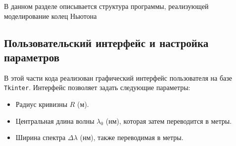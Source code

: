 \documentclass[a4paper,11pt]{article}
\theoremstyle{definition}
\begin{document}
    В данном разделе описывается структура программы, реализующей моделирование колец Ньютона

    \subsection{Пользовательский интерфейс и настройка параметров}
    В этой части кода реализован графический интерфейс пользователя на базе \texttt{Tkinter}.
    Интерфейс позволяет задать следующие параметры:
    \begin{itemize}
            \item Радиус кривизны \( R \) (м).
            \item Центральная длина волны \( \lambda_0 \) (нм), которая затем переводится в метры.
            \item Ширина спектра \(\Delta \lambda\) (нм), также переводимая в метры.
    \end{itemize}
\end{document}
